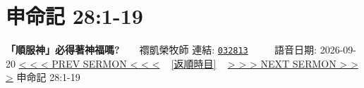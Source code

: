 \documentclass{book}
\begin{document}
\section{申命記 28:1-19}
\label{sec:032813}
\textbf{「順服神」必得著神福嗎?}~~~~禤凱榮牧師
\newline
\newline
連結: \href{http://www.church.com.hk/acms/content.asp?site=cdc\&op=show\&type=product\&code=032813\&layout=sermon}{\texttt{032813}} ~~~~ 語音日期: 2026-09-20
\newline
\newline
\hyperref[sec:032812]{\small{< < < PREV SERMON < < <}}
~
\hyperref[sec:index_chronic]{\small{[返順時目]}}
~
\hyperref[sec:032814]{\small{> > > NEXT SERMON > > >}}
\newline
\newline
申命記 28:1-19
\newline
\end{document}
